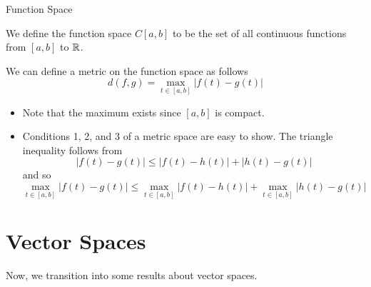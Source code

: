 \documentclass[10pt]{beamer}
\begin{document}
		\begin{frame}{Function Space}
				\begin{definition}
						We define the \alert{function space} $C[a,b]$ to be the set of all continuous functions from $[a,b]$ to $\mathbb{R}$. 
				\end{definition}
				We can define a metric on the function space as follows
				\begin{equation*}
						d(f, g) = \max_{t\in [a,b]} |f(t) - g(t)|
				\end{equation*}
				\begin{itemize}
						\item<1-> Note that the maximum exists since $[a,b]$ is compact. 
						\item<2-> Conditions 1, 2, and 3 of a metric space are easy to show. The triangle inequality follows from 
								\begin{equation*}
										|f(t) - g(t)| \leq |f(t) - h(t)| + |h(t) - g(t)|
								\end{equation*}
								and so 
								\begin{equation*}
										\max_{t\in [a,b]} |f(t) - g(t)| \leq \max_{t\in [a,b]} |f(t) - h(t)| + \max_{t\in [a,b]} |h(t) - g(t)|
								\end{equation*}
				\end{itemize}
		\end{frame}	
    
    \section{Vector Spaces}

    \begin{frame}[plain]
        Now, we transition into some results about vector spaces.
    \end{frame}
\end{document}
